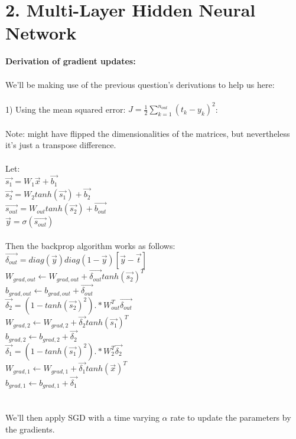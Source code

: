 \documentclass[11pt]{article}
\begin{document}
\section*{2. Multi-Layer Hidden Neural Network}

\textbf{ Derivation of gradient updates:}
\\\\
We'll be making use of the previous question's derivations to help us here:
\\\\
1) Using the mean squared error: $J = \frac{1}{2} \sum_{k=1}^{n_{out}} (t_k - y_k)^2 $:
\\\\
Note: might have flipped the dimensionalities of the matrices, but nevertheless it's just a transpose difference.
\\\\
Let: \\
$ \vec{s_1} = W_1 \vec{x} + \vec{b_1} $ \\
$ \vec{s_2} = W_2 tanh(\vec{s_1}) + \vec{b_2} $ \\
$ \vec{s_{out}} = W_{out} tanh ( \vec{s_2}) + \vec{b_{out}} $ \\
$ \vec{y} = \sigma (\vec{s_{out}}) $
\\\\
Then the backprop algorithm works as follows: \\
$ \vec{\delta_{out}} = diag(\vec{y}) diag(1 - \vec{y}) [ \vec{y} - \vec{t}] $ \\
$ W_{grad, out} \leftarrow W_{grad,out} + \vec{\delta_{out}} tanh(\vec{s_2})^T $ \\
$ b_{grad, out} \leftarrow b_{grad,out} + \vec{\delta_{out}}  $ \\
$ \vec{\delta_2} = (1 - tanh(\vec{s_2})^2) .* W_{out}^T \vec{\delta_{out}} $ \\
$ W_{grad, 2} \leftarrow W_{grad,2} + \vec{\delta_{2}} tanh(\vec{s_1})^T $ \\
$ b_{grad, 2} \leftarrow b_{grad,2} + \vec{\delta_{2}} $ \\
$ \vec{\delta_1} = (1 - tanh(\vec{s_1})^2) .* W_{2}^T \vec{\delta_{2}} $ \\
$ W_{grad, 1} \leftarrow W_{grad,1} + \vec{\delta_{1}} tanh(\vec{x})^T $ \\
$ b_{grad, 1} \leftarrow b_{grad,1} + \vec{\delta_{1}} $ \\
\\\\
We'll then apply SGD with a time varying $\alpha$ rate to update the parameters by the gradients.
\end{document}
